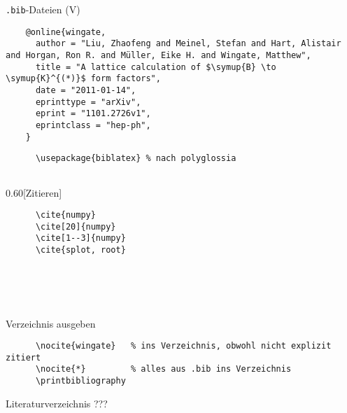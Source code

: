 \begin{frame}[fragile]{\texttt{.bib}-Dateien (V)}
  \begin{lstlisting}
    @online{wingate,
      author = "Liu, Zhaofeng and Meinel, Stefan and Hart, Alistair and Horgan, Ron R. and Müller, Eike H. and Wingate, Matthew",
      title = "A lattice calculation of $\symup{B} \to \symup{K}^{(*)}$ form factors",
      date = "2011-01-14",
      eprinttype = "arXiv",
      eprint = "1101.2726v1",
      eprintclass = "hep-ph",
    }
  \end{lstlisting}
  \vspace{1em}
\end{frame}

\begin{frame}[fragile]{
  \BibLaTeX
  \hfill
}
  \begin{Packages}
    \begin{lstlisting}
      \usepackage{biblatex} % nach polyglossia
      
    \end{lstlisting}
  \end{Packages}
  \begin{CodeExample}{0.60}[Zitieren]
    \begin{lstlisting}
      \cite{numpy}
      \cite[20]{numpy}
      \cite[1--3]{numpy}
      \cite{splot, root}
    \end{lstlisting}
  \CodeResult
    \cite{numpy} \\
    \cite[20]{numpy} \\
    \cite[1--3]{numpy} \\
    \cite{splot, root}
  \end{CodeExample}
  \begin{block}{Verzeichnis ausgeben}
    \begin{lstlisting}
      \nocite{wingate}   % ins Verzeichnis, obwohl nicht explizit zitiert
      \nocite{*}         % alles aus .bib ins Verzeichnis
      \printbibliography
    \end{lstlisting}
  \end{block}
\end{frame}

\begin{frame}{Literaturverzeichnis}
  \centering
  \pause
  \Huge ???
\end{frame}

